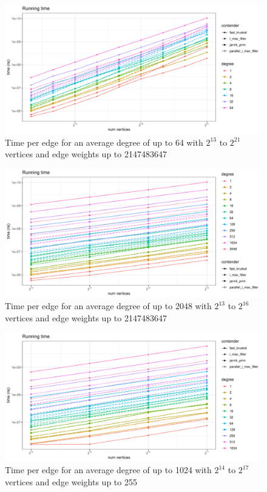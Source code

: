 \documentclass{article}
\begin{document}
\begin{figure}[htpb]
  \centering
  \includegraphics[width=\linewidth, page=5]{../plots/13_21_1_64_2147483647_1_2.pdf}
  \caption{Time per edge for an average degree of up to 64 with $2^{13}$ to $2^{21}$ vertices and edge weights up to 2147483647}%
  \label{fig:13_21_1_64_2147483647_1_2_p5}
\end{figure}

\begin{figure}[htpb]
  \centering
  \includegraphics[width=\linewidth, page=5]{../plots/13_16_1_2048_2147483647_1_2.pdf}
  \caption{Time per edge for an average degree of up to 2048 with $2^{13}$ to $2^{16}$ vertices and edge weights up to 2147483647}%
  \label{fig:13_16_1_2048_2147483647_1_2}
\end{figure}

\begin{figure}[htpb]
  \centering
  \includegraphics[width=\linewidth, page=5]{../plots/14_17_1_1024_255_1_2.pdf}
  \caption{Time per edge for an average degree of up to 1024 with $2^{14}$ to $2^{17}$ vertices and edge weights up to 255}%
  \label{fig:14_17_1_1024_255_1_2}
\end{figure}
\end{document}
